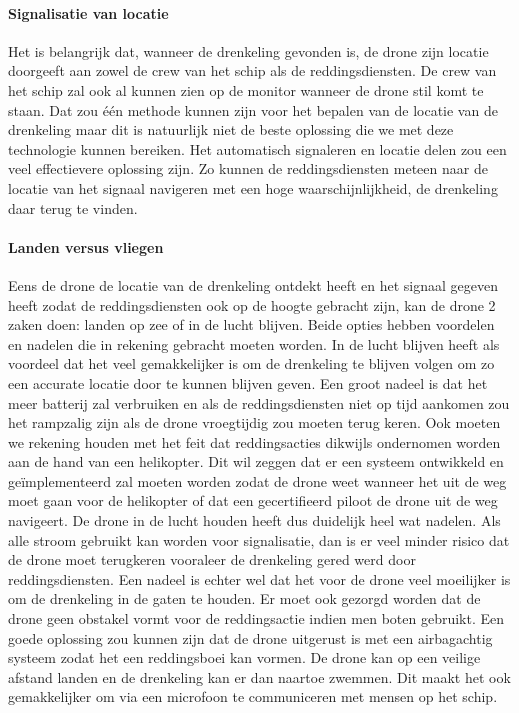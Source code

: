 \paragraph{Signalisatie van locatie}

Het is belangrijk dat, wanneer de drenkeling gevonden is, de drone zijn locatie doorgeeft aan zowel de crew van het schip als de reddingsdiensten. De crew van het schip zal ook al kunnen zien op de monitor wanneer de drone stil komt te staan. Dat zou één methode kunnen zijn voor het bepalen van de locatie van de drenkeling maar dit is natuurlijk niet de beste oplossing die we met deze technologie kunnen bereiken. Het automatisch signaleren en locatie delen zou een veel effectievere oplossing zijn. Zo kunnen de reddingsdiensten meteen naar de locatie van het signaal navigeren met een hoge waarschijnlijkheid, de drenkeling daar terug te vinden.  

\paragraph{Landen versus vliegen}

Eens de drone de locatie van de drenkeling ontdekt heeft en het signaal gegeven heeft zodat de reddingsdiensten ook op de hoogte gebracht zijn, kan de drone 2 zaken doen: landen op zee of in de lucht blijven. Beide opties hebben voordelen en nadelen die in rekening gebracht moeten worden. In de lucht blijven heeft als voordeel dat het veel gemakkelijker is om de drenkeling te blijven volgen om zo een accurate locatie door te kunnen blijven geven. Een groot nadeel is dat het  meer batterij zal verbruiken en als de reddingsdiensten niet op tijd aankomen zou het rampzalig zijn als de drone vroegtijdig zou moeten terug keren. Ook moeten we rekening houden met het feit dat reddingsacties dikwijls ondernomen worden aan de hand van een helikopter. Dit wil zeggen dat er een systeem ontwikkeld en geïmplementeerd zal moeten worden zodat de drone weet wanneer het uit de weg moet gaan voor de helikopter of dat een gecertifieerd piloot de drone uit de weg navigeert. De drone in de lucht houden heeft dus duidelijk heel wat nadelen. Als alle stroom gebruikt kan worden voor signalisatie, dan is er veel minder risico dat de drone moet terugkeren vooraleer de drenkeling gered werd door reddingsdiensten. Een nadeel is echter wel dat het voor de drone veel moeilijker is om de drenkeling in de gaten te houden. Er moet ook gezorgd worden dat de drone geen obstakel vormt voor de reddingsactie indien men boten gebruikt. Een goede oplossing zou kunnen zijn dat de drone uitgerust is met een airbagachtig systeem zodat het een reddingsboei kan vormen. De drone kan op een veilige afstand landen en de drenkeling kan er dan naartoe zwemmen. Dit maakt het ook gemakkelijker om via een microfoon te communiceren met mensen op het schip. 

